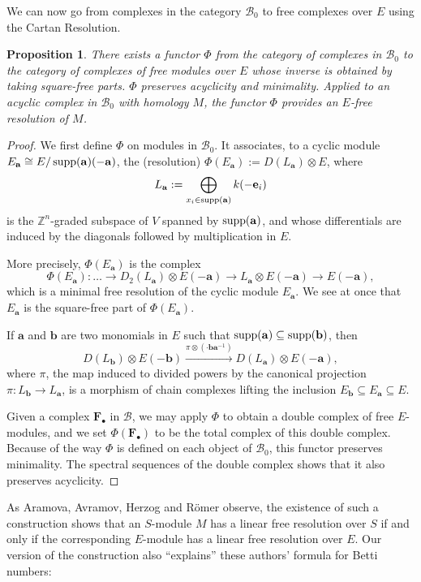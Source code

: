 \documentclass{tran-l}
\newtheorem{proposition}[theorem]{Proposition}
\theoremstyle{definition}
\theoremstyle{remark}
\newcommand{\Z}{{\mathbb{Z}}}
\newcommand{\baa}{{\mathbf{a}}}
\newcommand{\bb}{{\mathbf{b}}}
\newcommand{\ee}{{\mathbf{e}}}
\newcommand{\supp}{\mathop{\rm supp}\nolimits}
\newcommand{\B}{{\mathcal B}}
\begin{document}
We can now go from complexes in the category $\B_0$ to 
free complexes over $E$ using the
Cartan Resolution.

\begin{proposition}\label{equivEE} There exists a functor $\Phi$ from the
category of complexes in $\B_0$ to the category of complexes of free
modules over $E$ whose inverse is obtained by taking
square-free parts. $\Phi$ preserves acyclicity and minimality.
Applied to an acyclic complex in $\B_0$ with homology
$M$, the functor $\Phi$ provides an $E$-free resolution of $M$.
\end{proposition}

\begin{proof}  We first define $\Phi$ on modules in $\B_0$.
It associates, to a cyclic module 
$E_\baa\cong E/\supp(\baa)(-\baa)$, 
the (resolution) 
$\Phi(E_\baa):=D(L_\baa)\otimes E$, 
where 
\[L_\baa:=\bigoplus_{x_i\in\supp(\baa)}k(-\ee_i)\]
is the $\Z^n$-graded subspace of $V$ spanned by 
$\supp(\baa)$, and whose  differentials are induced by 
the diagonals followed by multiplication in $E$. 

More precisely, $\Phi(E_\baa)$ is the complex
\[\Phi(E_\baa):
\ldots\to D_2(L_\baa)\otimes E(-\baa)\to L_\baa\otimes E(-\baa)\to
E(-\baa),\]
which is a minimal free resolution of  the cyclic module $E_\baa$.
We see at
once that $E_\baa$ is the square-free part of $\Phi(E_\baa)$.

If $\baa$ and $\bb$ are two monomials in $E$ such that
$\supp(\baa)\subseteq\supp(\bb)$, then 
\[D(L_\bb)\otimes E(-\bb)\xrightarrow{\pi\otimes(\cdot \bb\baa^{-1})}
D(L_\baa)\otimes E(-\baa),\] 
where $\pi$, the map induced to divided powers by the 
canonical projection $\pi: L_\bb\to L_\baa$, is a morphism of
chain complexes lifting the inclusion
$E_\bb\subseteq E_\baa\subseteq E$.

Given a complex ${\mathbf F}_\bullet$ in $\B$, we may apply $\Phi$
to obtain a double complex of free $E$-modules, and we
set $\Phi({\mathbf F}_\bullet)$ to be the total complex of
this double complex. Because of the way $\Phi$ is defined on each
object of $\B_0$, this functor preserves minimality. The spectral
sequences of the double complex shows that it also preserves 
acyclicity.\end{proof}

As Aramova, Avramov, Herzog \cite{AAH} and R\"omer \cite{Ro}
observe, the existence of such a construction
shows that an $S$-module $M$
has a linear free resolution over $S$ if and only if the
corresponding $E$-module has a linear free resolution over $E$.
Our version of the construction also ``explains'' these authors'
formula for Betti numbers:
\end{document}
